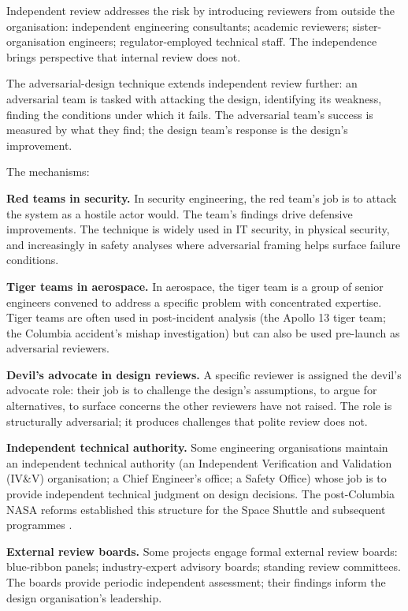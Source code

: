 Independent review addresses the risk by introducing reviewers from outside the organisation: independent engineering consultants; academic reviewers; sister-organisation engineers; regulator-employed technical staff. The independence brings perspective that internal review does not.

The adversarial-design technique extends independent review further: an adversarial team is tasked with attacking the design, identifying its weakness, finding the conditions under which it fails. The adversarial team's success is measured by what they find; the design team's response is the design's improvement.

The mechanisms:

\textbf{Red teams in security.} In security engineering, the red team's job is to attack the system as a hostile actor would. The team's findings drive defensive improvements. The technique is widely used in IT security, in physical security, and increasingly in safety analyses where adversarial framing helps surface failure conditions.

\textbf{Tiger teams in aerospace.} In aerospace, the tiger team is a group of senior engineers convened to address a specific problem with concentrated expertise. Tiger teams are often used in post-incident analysis (the Apollo 13 tiger team; the Columbia accident's mishap investigation) but can also be used pre-launch as adversarial reviewers.

\textbf{Devil's advocate in design reviews.} A specific reviewer is assigned the devil's advocate role: their job is to challenge the design's assumptions, to argue for alternatives, to surface concerns the other reviewers have not raised. The role is structurally adversarial; it produces challenges that polite review does not.

\textbf{Independent technical authority.} Some engineering organisations maintain an independent technical authority (an Independent Verification and Validation (IV\&V) organisation; a Chief Engineer's office; a Safety Office) whose job is to provide independent technical judgment on design decisions. The post-Columbia NASA reforms established this structure for the Space Shuttle and subsequent programmes \cite{acc:caib-columbia}.

\textbf{External review boards.} Some projects engage formal external review boards: blue-ribbon panels; industry-expert advisory boards; standing review committees. The boards provide periodic independent assessment; their findings inform the design organisation's leadership.

